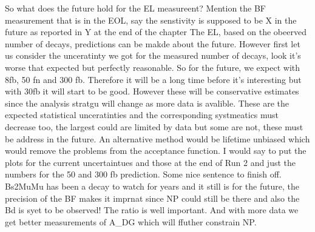 So what does the future hold for the EL measureent? 
Mention the BF measurement that is in the EOL, say the senstivity is supposed to be X in the future as reported in Y at the end of the chapter
The EL, based on the obeerved number of decays, predictions can be makde about the future. However first let us consider the unceratinty we got for the measured number of decays, look it's worse that expected but perfectly reasonable. So for the future, we expect with 8fb, 50 fn and 300 fb. Therefore it will be a long time before it's interesting but with 30fb it will start to be good. However these will be conservative estimates since the analysis stratgu will change as more data is avalible. These are the expected statistical unceratinties and the corresponding systmeatics must decrease too, the largest could are limited by data but some are not, these must be address in the future. An alternative method would be lifetime unbiased which would remove the problems from the acceptance function. 
I would say to put the plots for the current uncertaintues and those at the end of Run 2 and just the numbers for the 50 and 300 fb prediction.
Some nice sentence to finish off. Bs2MuMu has been a decay to watch for years and it still is for the future, the precision of the BF makes it imprnat since NP could still be there and also the Bd is syet to be observed! The ratio is well important. And with more data we get better measurements of A_DG which will ffuther constrain NP.
